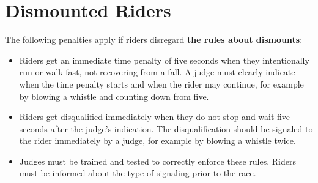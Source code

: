 \section{Dismounted Riders}
The following penalties apply if riders disregard \textbf{the rules about dismounts}:
\begin{itemize}
\item Riders get an immediate time penalty of five seconds when they intentionally run or walk fast, not recovering from a fall.
A judge must clearly indicate when the time penalty starts and when the rider may continue, for example by blowing a whistle and counting down from five.
\item Riders get disqualified immediately when they do not stop and wait five seconds after the judge's indication.
The disqualification should be signaled to the rider immediately by a judge, for example by blowing a whistle twice.
\item Judges must be trained and tested to correctly enforce these rules.
Riders must be informed about the type of signaling prior to the race.
\end{itemize}
